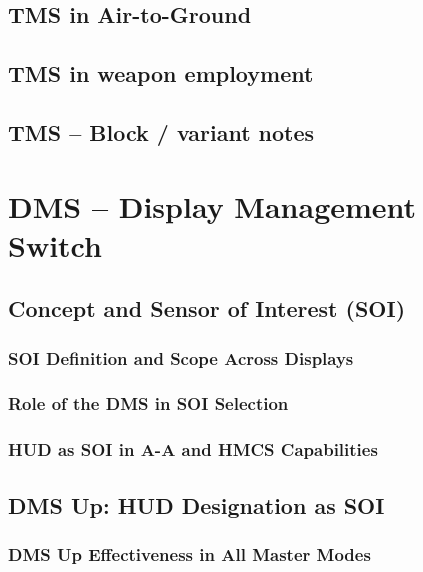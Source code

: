 \documentclass[11pt,a4paper]{article}
\begin{document}
\subsection{TMS in Air-to-Ground}

\subsection{TMS in weapon employment}

\subsection{TMS -- Block / variant notes}


\section{DMS -- Display Management Switch}

\subsection{Concept and Sensor of Interest (SOI)}

\subsubsection{SOI Definition and Scope Across Displays}

\subsubsection{Role of the DMS in SOI Selection}

\subsubsection{HUD as SOI in A-A and HMCS Capabilities}

\subsection{DMS Up: HUD Designation as SOI}

\subsubsection{DMS Up Effectiveness in All Master Modes}
\end{document}
